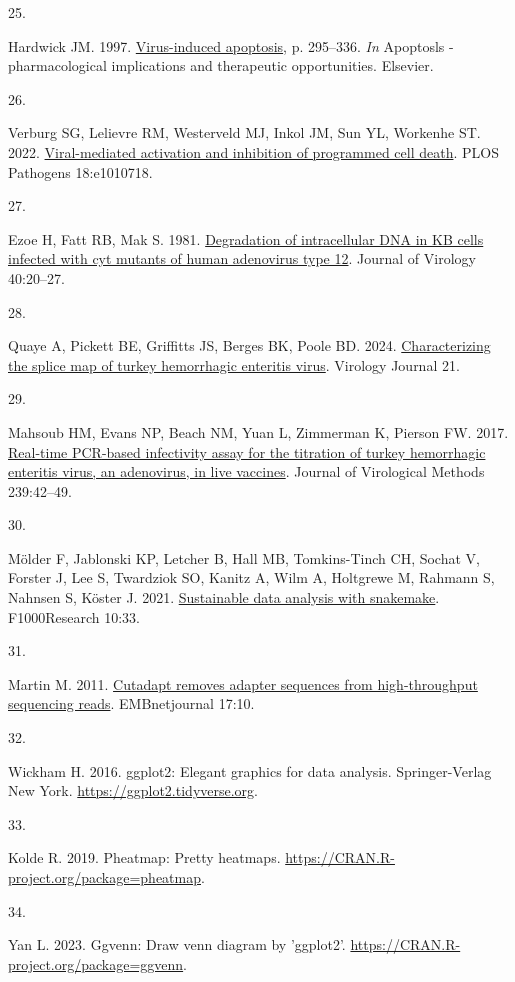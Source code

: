 \documentclass[
]{article}
\newlength{\cslhangindent}
\newlength{\csllabelwidth}
\newenvironment{CSLReferences}[2] %
 {\begin{list}{}{%
  \setlength{\itemindent}{0pt}
  \setlength{\leftmargin}{0pt}
  \setlength{\parsep}{0pt}
  \ifodd #1
   \setlength{\leftmargin}{\cslhangindent}
   \setlength{\itemindent}{-1\cslhangindent}
  \fi
  \setlength{\itemsep}{#2\baselineskip}}}
 {\end{list}}
\newcommand{\CSLLeftMargin}[1]{\parbox[t]{\csllabelwidth}{\strut#1\strut}}
\newcommand{\CSLRightInline}[1]{\parbox[t]{\linewidth - \csllabelwidth}{\strut#1\strut}}
\begin{document}
\begin{CSLReferences}{0}{1}
\CSLLeftMargin{25. }%
\CSLRightInline{Hardwick JM. 1997.
\href{https://doi.org/10.1016/s1054-3589(08)61063-7}{Virus-induced
apoptosis}, p. 295--336. \emph{In} Apoptosls - pharmacological
implications and therapeutic opportunities. Elsevier.}

\CSLLeftMargin{26. }%
\CSLRightInline{Verburg SG, Lelievre RM, Westerveld MJ, Inkol JM, Sun
YL, Workenhe ST. 2022.
\href{https://doi.org/10.1371/journal.ppat.1010718}{Viral-mediated
activation and inhibition of programmed cell death}. PLOS Pathogens
18:e1010718.}

\CSLLeftMargin{27. }%
\CSLRightInline{Ezoe H, Fatt RB, Mak S. 1981.
\href{https://doi.org/10.1128/jvi.40.1.20-27.1981}{Degradation of
intracellular DNA in KB cells infected with cyt mutants of human
adenovirus type 12}. Journal of Virology 40:20--27.}

\CSLLeftMargin{28. }%
\CSLRightInline{Quaye A, Pickett BE, Griffitts JS, Berges BK, Poole BD.
2024. \href{https://doi.org/10.1186/s12985-024-02449-0}{Characterizing
the splice map of turkey hemorrhagic enteritis virus}. Virology Journal
21.}

\CSLLeftMargin{29. }%
\CSLRightInline{Mahsoub HM, Evans NP, Beach NM, Yuan L, Zimmerman K,
Pierson FW. 2017.
\href{https://doi.org/10.1016/j.jviromet.2016.11.002}{Real-time
{PCR}-based infectivity assay for the titration of turkey hemorrhagic
enteritis virus, an adenovirus, in live vaccines}. Journal of
Virological Methods 239:42--49.}

\CSLLeftMargin{30. }%
\CSLRightInline{Mölder F, Jablonski KP, Letcher B, Hall MB,
Tomkins-Tinch CH, Sochat V, Forster J, Lee S, Twardziok SO, Kanitz A,
Wilm A, Holtgrewe M, Rahmann S, Nahnsen S, Köster J. 2021.
\href{https://doi.org/10.12688/f1000research.29032.2}{Sustainable data
analysis with snakemake}. F1000Research 10:33.}

\CSLLeftMargin{31. }%
\CSLRightInline{Martin M. 2011.
\href{https://doi.org/10.14806/ej.17.1.200}{Cutadapt removes adapter
sequences from high-throughput sequencing reads}. EMBnetjournal 17:10.}

\CSLLeftMargin{32. }%
\CSLRightInline{Wickham H. 2016. ggplot2: Elegant graphics for data
analysis. Springer-Verlag New York.
\url{https://ggplot2.tidyverse.org}.}

\CSLLeftMargin{33. }%
\CSLRightInline{Kolde R. 2019. Pheatmap: Pretty heatmaps.
\url{https://CRAN.R-project.org/package=pheatmap}.}

\CSLLeftMargin{34. }%
\CSLRightInline{Yan L. 2023. Ggvenn: Draw venn diagram by 'ggplot2'.
\url{https://CRAN.R-project.org/package=ggvenn}.}

\end{CSLReferences}
\end{document}
